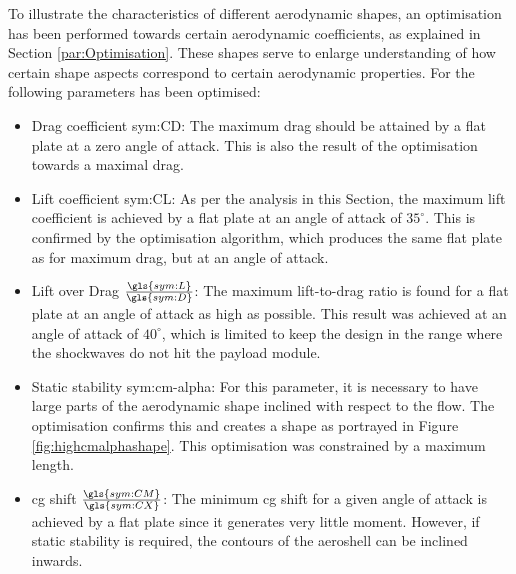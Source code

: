 To illustrate the characteristics of different aerodynamic shapes, an optimisation has been performed towards certain aerodynamic coefficients, as explained in Section \ref{par:Optimisation}. These shapes serve to enlarge understanding of how certain shape aspects correspond to certain aerodynamic properties. For the following parameters has been optimised:
\begin{itemize}
	\item Drag coefficient \gls{sym:CD}: The maximum drag should be attained by a flat plate at a zero angle of attack. This is also the result of the optimisation towards a maximal drag.
	\item Lift coefficient \gls{sym:CL}: As per the analysis in this Section, the maximum lift coefficient is achieved by a flat plate at an angle of attack of $35^\circ$. This is confirmed by the optimisation algorithm, which produces the same flat plate as for maximum drag, but at an angle of attack.
	\item Lift over Drag $\frac{\gls{sym:L}}{\gls{sym:D}}$: The maximum lift-to-drag ratio is found for a flat plate at an angle of attack as high as possible. This result was achieved at an angle of attack of $40^\circ$, which is limited to keep the design in the range where the shockwaves do not hit the payload module.
	\item Static stability \gls{sym:cm-alpha}: For this parameter, it is necessary to have large parts of the aerodynamic shape inclined with respect to the flow. The optimisation confirms this and creates a shape as portrayed in Figure \ref{fig:highcmalphashape}. This optimisation was constrained by a maximum length.
	\item \gls{cg} shift $\frac{\gls{sym:CM}}{\gls{sym:CX}}$: The minimum \gls{cg} shift for a given angle of attack is achieved by a flat plate since it generates very little moment. However, if static stability is required, the contours of the aeroshell can be inclined inwards.
\end{itemize}

